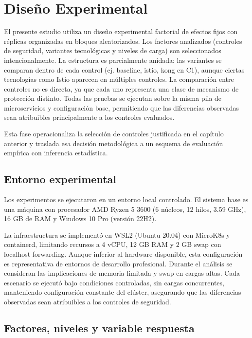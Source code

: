 \chapter{Diseño Experimental}

El presente estudio utiliza un diseño experimental factorial de efectos fijos con réplicas organizadas en bloques aleatorizados. Los factores analizados (controles de seguridad, variantes tecnológicas y niveles de carga) son seleccionados intencionalmente. La estructura es parcialmente anidada: las variantes se comparan dentro de cada control (ej. baseline, istio, kong en C1), aunque ciertas tecnologías como Istio aparecen en múltiples controles. La comparación entre controles no es directa, ya que cada uno representa una clase de mecanismo de protección distinto. Todas las pruebas se ejecutan sobre la misma pila de microservicios y configuración base, permitiendo que las diferencias observadas sean atribuibles principalmente a los controles evaluados.

Esta fase operacionaliza la selección de controles justificada en el capítulo anterior y traslada esa decisión metodológica a un esquema de evaluación empírica con inferencia estadística.

\section{Entorno experimental}

Los experimentos se ejecutaron en un entorno local controlado. El sistema base es una máquina con procesador AMD Ryzen 5 3600 (6 núcleos, 12 hilos, 3.59 GHz), 16 GB de RAM y Windows 10 Pro (versión 22H2).

La infraestructura se implementó en WSL2 (Ubuntu 20.04) con MicroK8s y containerd, limitando recursos a 4 vCPU, 12 GB RAM y 2 GB swap con localhost forwarding. Aunque inferior al hardware disponible, esta configuración es representativa de entornos de desarrollo profesional. Durante el análisis se consideran las implicaciones de memoria limitada y swap en cargas altas. Cada escenario se ejecutó bajo condiciones controladas, sin cargas concurrentes, manteniendo configuración constante del clúster, asegurando que las diferencias observadas sean atribuibles a los controles de seguridad.
\section{Factores, niveles y variable respuesta}

